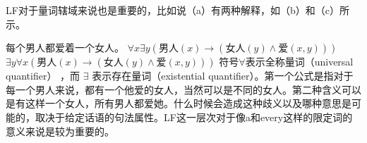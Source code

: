 LF对于量词辖域来说也是重要的，比如说（a）有两种解释，如（b）和（c）所示。

\eal
\label{Beispiel-Every-man-loves-a-woman}
\ex 每个男人都爱着一个女人。
\ex $\forall x \exists y (男人(x) \to (女人(y) \wedge 爱(x,y)))$
\ex $\exists y \forall x (男人(x) \to (女人(y) \wedge 爱(x,y)))$
\zl
符号$\forall$\is{$\forall$}表示全称量词（universal quantifier） ，而 $\exists$\is{$\exists$} 表示存在量词（existential quantifier）。第一个公式是指对于每一个男人来说，都有一个他爱的女人，当然可以是不同的女人。第二种含义可以是有这样一个女人，所有男人都爱她。什么时候会造成这种歧义以及哪种意思是可能的，取决于给定话语的句法属性。LF这一层次对于像a和every这样的限定词的意义来说是较为重要的。

